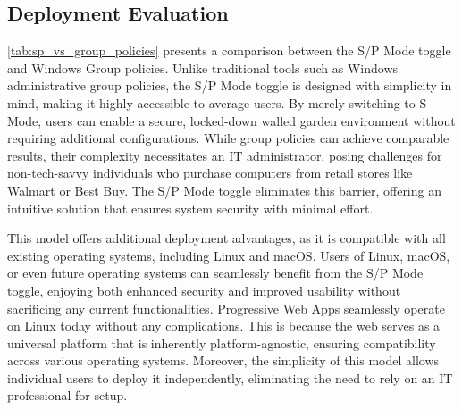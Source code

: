 \subsection{Deployment Evaluation}

\autoref{tab:sp_vs_group_policies} presents a comparison between the S/P Mode toggle and Windows Group policies. Unlike traditional tools such as Windows administrative group policies, the S/P Mode toggle is designed with simplicity in mind, making it highly accessible to average users. By merely switching to S Mode, users can enable a secure, locked-down walled garden environment without requiring additional configurations. While group policies can achieve comparable results, their complexity necessitates an IT administrator, posing challenges for non-tech-savvy individuals who purchase computers from retail stores like Walmart or Best Buy. The S/P Mode toggle eliminates this barrier, offering an intuitive solution that ensures system security with minimal effort.

This model offers additional deployment advantages, as it is compatible with all existing operating systems, including Linux and macOS. Users of Linux, macOS, or even future operating systems can seamlessly benefit from the S/P Mode toggle, enjoying both enhanced security and improved usability without sacrificing any current functionalities. Progressive Web Apps seamlessly operate on Linux today without any complications. This is because the web serves as a universal platform that is inherently platform-agnostic, ensuring compatibility across various operating systems. Moreover, the simplicity of this model allows individual users to deploy it independently, eliminating the need to rely on an IT professional for setup.

